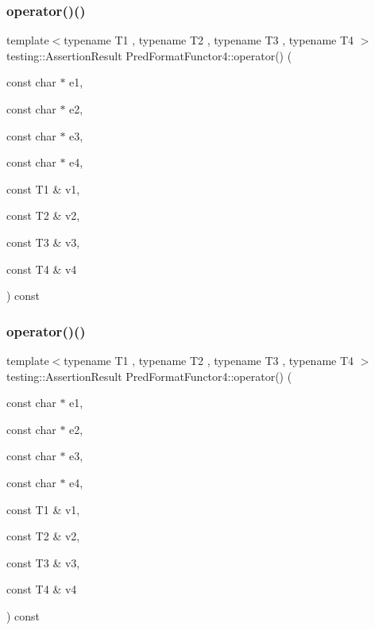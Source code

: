 \subsubsection{\texorpdfstring{operator()()}{operator()()}\hspace{0.1cm}{\footnotesize\ttfamily [1/3]}}
{\footnotesize\ttfamily template$<$typename T1 , typename T2 , typename T3 , typename T4 $>$ \\
testing\+::\+Assertion\+Result Pred\+Format\+Functor4\+::operator() (\begin{DoxyParamCaption}\item[{const char $\ast$}]{e1,  }\item[{const char $\ast$}]{e2,  }\item[{const char $\ast$}]{e3,  }\item[{const char $\ast$}]{e4,  }\item[{const T1 \&}]{v1,  }\item[{const T2 \&}]{v2,  }\item[{const T3 \&}]{v3,  }\item[{const T4 \&}]{v4 }\end{DoxyParamCaption}) const\hspace{0.3cm}{\ttfamily [inline]}}

\mbox{\label{struct_pred_format_functor4_a97061d2b9eadf357f4e50a75f5a9af5b}} 
\subsubsection{\texorpdfstring{operator()()}{operator()()}\hspace{0.1cm}{\footnotesize\ttfamily [2/3]}}
{\footnotesize\ttfamily template$<$typename T1 , typename T2 , typename T3 , typename T4 $>$ \\
testing\+::\+Assertion\+Result Pred\+Format\+Functor4\+::operator() (\begin{DoxyParamCaption}\item[{const char $\ast$}]{e1,  }\item[{const char $\ast$}]{e2,  }\item[{const char $\ast$}]{e3,  }\item[{const char $\ast$}]{e4,  }\item[{const T1 \&}]{v1,  }\item[{const T2 \&}]{v2,  }\item[{const T3 \&}]{v3,  }\item[{const T4 \&}]{v4 }\end{DoxyParamCaption}) const\hspace{0.3cm}{\ttfamily [inline]}}

